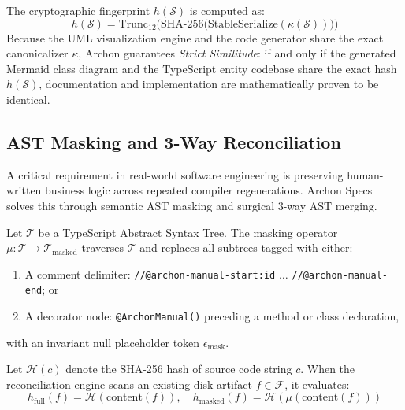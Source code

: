 The cryptographic fingerprint $h(\mathcal{S})$ is computed as:
\begin{equation}
  h(\mathcal{S}) = \text{Trunc}_{12}\Big(\text{SHA-256}\big(\text{StableSerialize}(\kappa(\mathcal{S}))\big)\Big)
\end{equation}
Because the UML visualization engine and the code generator share the exact canonicalizer $\kappa$, Archon guarantees \emph{Strict Similitude}: if and only if the generated Mermaid class diagram and the TypeScript entity codebase share the exact hash $h(\mathcal{S})$, documentation and implementation are mathematically proven to be identical.

\subsection{AST Masking and 3-Way Reconciliation}
A critical requirement in real-world software engineering is preserving human-written business logic across repeated compiler regenerations. Archon Specs solves this through semantic AST masking and surgical 3-way AST merging.

\begin{definition}
Let $\mathcal{T}$ be a TypeScript Abstract Syntax Tree. The masking operator $\mu: \mathcal{T} \to \mathcal{T}_{\text{masked}}$ traverses $\mathcal{T}$ and replaces all subtrees tagged with either:
\begin{enumerate}[leftmargin=*]
  \item A comment delimiter: \texttt{//@archon-manual-start:id} $\dots$ \texttt{//@archon-manual-end}; or
  \item A decorator node: \texttt{@ArchonManual()} preceding a method or class declaration,
\end{enumerate}
with an invariant null placeholder token $\epsilon_{\text{mask}}$.
\end{definition}

Let $\mathcal{H}(c)$ denote the SHA-256 hash of source code string $c$. When the reconciliation engine scans an existing disk artifact $f \in \mathcal{F}$, it evaluates:
\begin{equation}
  h_{\text{full}}(f) = \mathcal{H}(\text{content}(f)), \quad h_{\text{masked}}(f) = \mathcal{H}(\mu(\text{content}(f)))
\end{equation}

